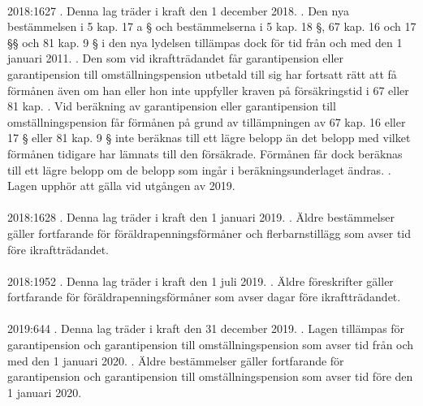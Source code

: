 \documentclass[a4paper,notitlepage,openany,10pt]{book}
\begin{document}
\paragraph*{}
2018:1627
. Denna lag träder i kraft den 1 december 2018.
. Den nya bestämmelsen i 5 kap. 17 a § och bestämmelserna i 5 kap. 18 §, 67 kap. 16 och 17 §§ och 81 kap. 9 § i den nya lydelsen tillämpas dock för tid från och med den 1 januari 2011.
. Den som vid ikraftträdandet får garantipension eller garantipension till omställningspension utbetald till sig har fortsatt rätt att få förmånen även om han eller hon inte uppfyller kraven på försäkringstid i 67 eller 81 kap.
. Vid beräkning av garantipension eller garantipension till omställningspension får förmånen på grund av tillämpningen av 67 kap. 16 eller 17 § eller 81 kap. 9 § inte beräknas till ett lägre belopp än det belopp med vilket förmånen tidigare har lämnats till den försäkrade. Förmånen får dock beräknas till ett lägre belopp om de belopp som ingår i beräkningsunderlaget ändras.
. Lagen upphör att gälla vid utgången av 2019.
\paragraph*{}
2018:1628
. Denna lag träder i kraft den 1 januari 2019.
. Äldre bestämmelser gäller fortfarande för föräldrapenningsförmåner och flerbarnstillägg som avser tid före ikraftträdandet.
\paragraph*{}
2018:1952
. Denna lag träder i kraft den 1 juli 2019.
. Äldre föreskrifter gäller fortfarande för föräldrapenningsförmåner som avser dagar före ikraftträdandet.
\paragraph*{}
2019:644
. Denna lag träder i kraft den 31 december 2019.
. Lagen tillämpas för garantipension och garantipension till omställningspension som avser tid från och med den 1 januari 2020.
. Äldre bestämmelser gäller fortfarande för garantipension och garantipension till omställningspension som avser tid före den 1 januari 2020.
\end{document}
